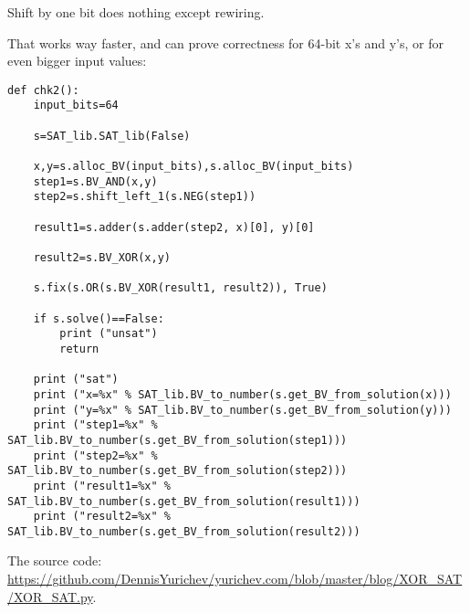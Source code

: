 Shift by one bit does nothing except rewiring.

That works way faster, and can prove correctness for 64-bit x's and y's, or for even bigger input values:

\begin{lstlisting}
def chk2():
    input_bits=64

    s=SAT_lib.SAT_lib(False)

    x,y=s.alloc_BV(input_bits),s.alloc_BV(input_bits)
    step1=s.BV_AND(x,y)
    step2=s.shift_left_1(s.NEG(step1))

    result1=s.adder(s.adder(step2, x)[0], y)[0]

    result2=s.BV_XOR(x,y)

    s.fix(s.OR(s.BV_XOR(result1, result2)), True)

    if s.solve()==False:
        print ("unsat")
        return

    print ("sat")
    print ("x=%x" % SAT_lib.BV_to_number(s.get_BV_from_solution(x)))
    print ("y=%x" % SAT_lib.BV_to_number(s.get_BV_from_solution(y)))
    print ("step1=%x" % SAT_lib.BV_to_number(s.get_BV_from_solution(step1)))
    print ("step2=%x" % SAT_lib.BV_to_number(s.get_BV_from_solution(step2)))
    print ("result1=%x" % SAT_lib.BV_to_number(s.get_BV_from_solution(result1)))
    print ("result2=%x" % SAT_lib.BV_to_number(s.get_BV_from_solution(result2)))
\end{lstlisting}

The source code: \url{https://github.com/DennisYurichev/yurichev.com/blob/master/blog/XOR_SAT/XOR_SAT.py}.

